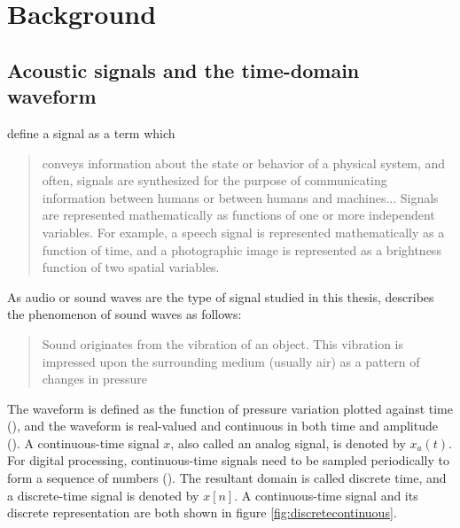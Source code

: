 \documentclass[report.tex]{subfiles}
\begin{document}

\vfill
\clearpage

\section{Background}
\label{sec:background}

\subsection{Acoustic signals and the time-domain waveform}
\label{sec:timedomain}

\textcite[Chapter~2]{discretebook} define a signal as a term which

\begin{quote}
	conveys information about the state or behavior of a physical system, and often, signals are synthesized for the purpose of communicating information between humans or between humans and machines... Signals are represented mathematically as functions of one or more independent variables. For example, a speech signal is represented mathematically as a function of time, and a photographic image is represented as a brightness function of two spatial variables.
\end{quote}

As audio or sound waves are the type of signal studied in this thesis, \textcite[Chapter~2]{moore} describes the phenomenon of sound waves as follows:

\begin{quote}
	Sound originates from the vibration of an object. This vibration is impressed upon the surrounding medium (usually air) as a pattern of changes in pressure
\end{quote}

The waveform is defined as the function of pressure variation plotted against time (\cite{moore, melbook}), and the waveform is real-valued and continuous in both time and amplitude (\cite[Chapter~2]{melbook}). A continuous-time signal $x$, also called an analog signal, is denoted by $x_{a}(t)$. For digital processing, continuous-time signals need to be sampled periodically to form a sequence of numbers (\cite[Chapter~2]{discretebook}). The resultant domain is called discrete time, and a discrete-time signal is denoted by $x[n]$.  A continuous-time signal and its discrete representation are both shown in figure \ref{fig:discretecontinuous}.
\end{document}
